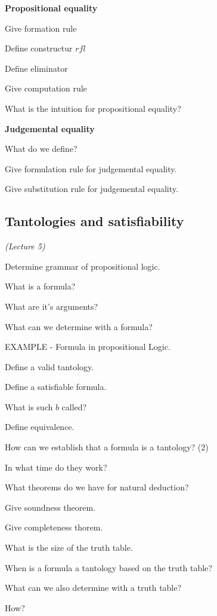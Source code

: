 \documentclass[fleqn]{article}
\begin{document}
\textbf{Propositional equality}
\begin{enumerate}
    {\color{green}\item Give formation rule}
    {\color{blue}\item Define constructur $rfl$}
    {\color{green}\item Define eliminator}
    {\color{green}\item Give computation rule}
    {\color{red}\item What is the intuition for propositional equality?}
\end{enumerate}

\textbf{Judgemental equality}
\begin{enumerate}
    {\color{red}\item What do we define?}
    {\color{green}\item Give formulation rule for judgemental equality.}
    {\color{green}\item Give substitution rule for judgemental equality.}
\end{enumerate}


\subsection{Tantologies and satisfiability}
\textit{(Lecture 5)}
\begin{enumerate}
    {\color{red}\item Determine grammar of propositional logic.}
    {\color{red}\item What is a formula?}
    {\color{red}\item What are it's arguments?}
    {\color{green}\item What can we determine with a formula?}
    {\color{red}\item EXAMPLE - Formula in propositional Logic.}
    {\color{red}\item Define a valid tantology.}
    {\color{red}\item Define a satisfiable formula.}
    {\color{green}\item What is such $b$ called?}
    {\color{red}\item Define equivalence.}
    {\color{red}\item How can we establish that a formula is a tantology? (2)}
    \item In what time do they work?
    \item What theorems do we have for natural deduction?
    {\color{green}\item Give soundness theorem.}
    {\color{green}\item Give completeness thorem.}
    {\color{red}\item What is the size of the truth table.}
    \item When is a formula a tantology based on the truth table?
    \item What can we also determine with a truth table?
    \item How?
\end{enumerate}
\end{document}
